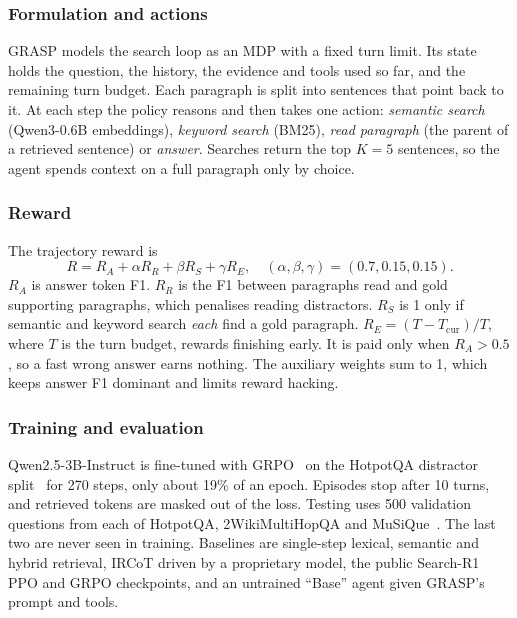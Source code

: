 \documentclass[conference]{IEEEtran}
\begin{document}
\subsubsection{Formulation and actions}
GRASP models the search loop as an MDP with a fixed turn limit. Its state holds the question, the history, the evidence and tools used so far, and the remaining turn budget. Each paragraph is split into sentences that point back to it. At each step the policy reasons and then takes one action: \emph{semantic search} (Qwen3-0.6B embeddings), \emph{keyword search} (BM25), \emph{read paragraph} (the parent of a retrieved sentence) or \emph{answer}. Searches return the top $K=5$ sentences, so the agent spends context on a full paragraph only by choice.

\subsubsection{Reward}
The trajectory reward is
\begin{equation}
R = R_A + \alpha R_R + \beta R_S + \gamma R_E, \quad (\alpha,\beta,\gamma) = (0.7, 0.15, 0.15).
\label{eq:grasp}
\end{equation}
$R_A$ is answer token F1. $R_R$ is the F1 between paragraphs read and gold supporting paragraphs, which penalises reading distractors. $R_S$ is 1 only if semantic and keyword search \emph{each} find a gold paragraph. $R_E = (T - T_{\text{cur}})/T$, where $T$ is the turn budget, rewards finishing early. It is paid only when $R_A > 0.5$, so a fast wrong answer earns nothing. The auxiliary weights sum to 1, which keeps answer F1 dominant and limits reward hacking.

\subsubsection{Training and evaluation}
Qwen2.5-3B-Instruct is fine-tuned with GRPO~\cite{shao2024deepseekmath} on the HotpotQA distractor split~\cite{yang2018hotpotqa} for 270 steps, only about 19\% of an epoch. Episodes stop after 10 turns, and retrieved tokens are masked out of the loss. Testing uses 500 validation questions from each of HotpotQA, 2WikiMultiHopQA and MuSiQue~\cite{yang2018hotpotqa,ho2020twowiki,trivedi2022musique}. The last two are never seen in training. Baselines are single-step lexical, semantic and hybrid retrieval, IRCoT driven by a proprietary model, the public Search-R1 PPO and GRPO checkpoints, and an untrained ``Base'' agent given GRASP's prompt and tools.
\end{document}
